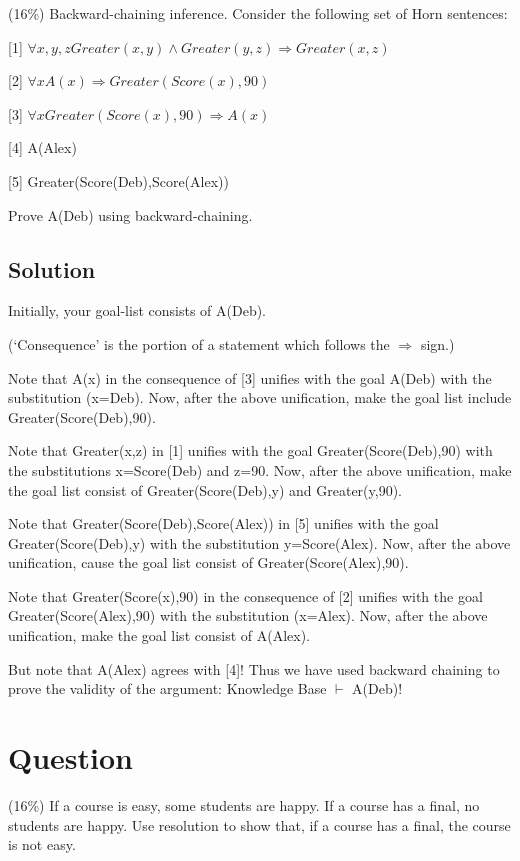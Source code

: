 \documentclass[a4paper,10pt]{article}
\begin{document}
 (16\%) Backward-chaining inference. Consider the following set of Horn sentences:

[1]      $\forall x,y,z Greater(x,y) ∧ Greater(y,z) \Rightarrow Greater(x,z)$

[2]      $\forall x A(x) \Rightarrow Greater(Score(x),90)$

[3]      $\forall x Greater(Score(x),90) \Rightarrow A(x)$

[4]      A(Alex)

[5]      Greater(Score(Deb),Score(Alex))


Prove A(Deb) using backward-chaining.

\subsection{Solution}

Initially, your goal-list consists of A(Deb).

(`Consequence' is the portion of a statement which follows the $\Rightarrow$ sign.)

Note that A(x) in the consequence of [3] unifies with the goal A(Deb) with the substitution (x=Deb). Now, after the above unification, make the goal list include Greater(Score(Deb),90).

Note that Greater(x,z) in [1] unifies with the goal Greater(Score(Deb),90) with the substitutions x=Score(Deb) and z=90. Now, after the above unification, make the goal list consist of Greater(Score(Deb),y) and Greater(y,90).

Note that Greater(Score(Deb),Score(Alex)) in [5] unifies with the goal Greater(Score(Deb),y) with the substitution y=Score(Alex). Now, after the above unification, cause the goal list consist of Greater(Score(Alex),90).

Note that Greater(Score(x),90) in the consequence of [2] unifies with the goal Greater(Score(Alex),90) with the substitution (x=Alex). Now, after the above unification, make the goal list consist of A(Alex).

But note that A(Alex) agrees with [4]! Thus we have used backward chaining to prove the validity of the argument: Knowledge Base $\vdash$ A(Deb)!


\section{Question}
 (16\%) If a course is easy, some students are happy. If a course has a final, no students are happy. Use resolution to show that, if a course has a final, the course is not easy.
\end{document}

